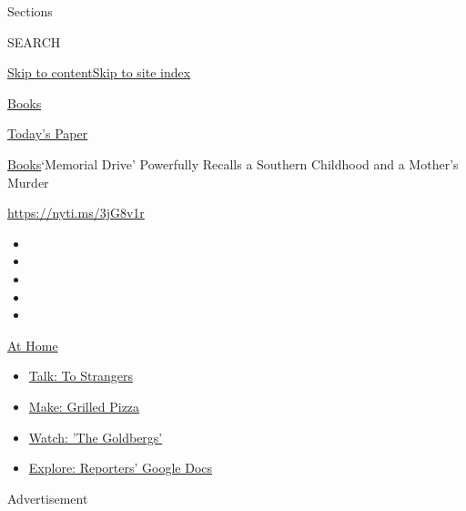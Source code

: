 Sections

SEARCH

\protect\hyperlink{site-content}{Skip to
content}\protect\hyperlink{site-index}{Skip to site index}

\href{https://www.nytimes.com/section/books}{Books}

\href{https://myaccount.nytimes.com/auth/login?response_type=cookie\&client_id=vi}{}

\href{https://www.nytimes.com/section/todayspaper}{Today's Paper}

\href{/section/books}{Books}\textbar{}`Memorial Drive' Powerfully
Recalls a Southern Childhood and a Mother's Murder

\url{https://nyti.ms/3jG8v1r}

\begin{itemize}
\item
\item
\item
\item
\item
\end{itemize}

\href{https://www.nytimes.com/spotlight/at-home?action=click\&pgtype=Article\&state=default\&region=TOP_BANNER\&context=at_home_menu}{At
Home}

\begin{itemize}
\tightlist
\item
  \href{https://www.nytimes.com/2020/08/03/well/family/the-benefits-of-talking-to-strangers.html?action=click\&pgtype=Article\&state=default\&region=TOP_BANNER\&context=at_home_menu}{Talk:
  To Strangers}
\item
  \href{https://www.nytimes.com/2020/08/01/at-home/coronavirus-make-pizza-on-a-grill.html?action=click\&pgtype=Article\&state=default\&region=TOP_BANNER\&context=at_home_menu}{Make:
  Grilled Pizza}
\item
  \href{https://www.nytimes.com/2020/07/31/arts/television/goldbergs-abc-stream.html?action=click\&pgtype=Article\&state=default\&region=TOP_BANNER\&context=at_home_menu}{Watch:
  'The Goldbergs'}
\item
  \href{https://www.nytimes.com/interactive/2020/at-home/even-more-reporters-editors-diaries-lists-recommendations.html?action=click\&pgtype=Article\&state=default\&region=TOP_BANNER\&context=at_home_menu}{Explore:
  Reporters' Google Docs}
\end{itemize}

Advertisement

